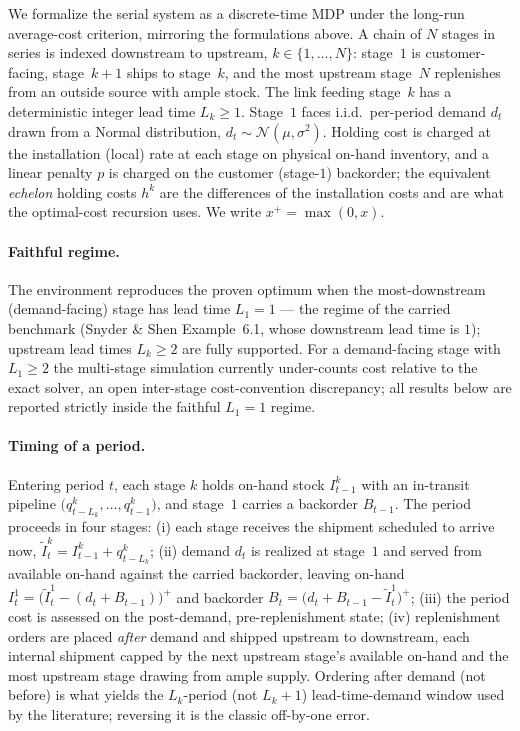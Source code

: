 \documentclass[11pt]{article}
\begin{document}
We formalize the serial system as a discrete-time MDP under the long-run average-cost criterion,
mirroring the formulations above. A chain of $N$ stages in series is indexed downstream to upstream,
$k\in\{1,\dots,N\}$: stage~$1$ is customer-facing, stage~$k{+}1$ ships to stage~$k$, and the most
upstream stage~$N$ replenishes from an outside source with ample stock. The link feeding stage~$k$ has
a deterministic integer lead time $L_k\ge 1$. Stage~$1$ faces i.i.d.\ per-period demand $d_t$ drawn
from a Normal distribution, $d_t\sim\mathcal N(\mu,\sigma^2)$. Holding cost is charged at the
installation (local) rate at each stage on physical on-hand inventory, and a linear penalty $p$ is
charged on the customer (stage-$1$) backorder; the equivalent \emph{echelon} holding costs $h^k$ are
the differences of the installation costs and are what the optimal-cost recursion uses.
We write $x^+=\max(0,x)$.

\paragraph{Faithful regime.}
The environment reproduces the proven optimum when the most-downstream (demand-facing) stage has lead
time $L_1=1$ --- the regime of the carried benchmark (Snyder \& Shen Example~6.1, whose downstream
lead time is $1$); upstream lead times $L_k\ge 2$ are fully supported. For a demand-facing stage with
$L_1\ge 2$ the multi-stage simulation currently under-counts cost relative to the exact solver, an
open inter-stage cost-convention discrepancy; all results below are reported
strictly inside the faithful $L_1=1$ regime.

\paragraph{Timing of a period.}
Entering period $t$, each stage $k$ holds on-hand stock $I^k_{t-1}$ with an in-transit pipeline
$\big(q^k_{t-L_k},\dots,q^k_{t-1}\big)$, and stage~$1$ carries a backorder $B_{t-1}$. The period
proceeds in four stages: (i) each stage receives the shipment scheduled to
arrive now, $\widetilde I^k_t = I^k_{t-1}+q^k_{t-L_k}$; (ii) demand $d_t$ is realized at stage~$1$ and
served from available on-hand against the carried backorder, leaving on-hand
$I^1_t=\big(\widetilde I^1_t-(d_t+B_{t-1})\big)^+$ and backorder
$B_t=\big(d_t+B_{t-1}-\widetilde I^1_t\big)^+$; (iii) the period cost is assessed on the post-demand,
pre-replenishment state; (iv) replenishment orders are placed \emph{after} demand and shipped upstream
to downstream, each internal shipment capped by the next upstream stage's available on-hand and the
most upstream stage drawing from ample supply. Ordering after demand (not before) is what yields the
$L_k$-period (not $L_k{+}1$) lead-time-demand window used by the literature; reversing it is the
classic off-by-one error.
\end{document}
